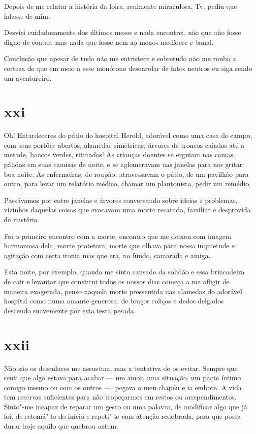 \asterisc

Depois de me relatar a história da loira, realmente miraculosa,
Tv. pediu que falasse de mim.

Desviei cuidadosamente dos últimos meses e nada encontrei, não que não
fosse digno de contar, mas nada que fosse nem ao menos medíocre e banal.

Conclusão que apesar de tudo não me entristece e sobretudo não me
rouba a certeza de que em meio a esse monótono desenrolar de fatos
neutros eu siga sendo um aventureiro.

\section{xxi}

Oh! Entardeceres do pátio do hospital Herold, adorável como uma casa de
campo, com seus portões abertos, alamedas simétricas, árvores de troncos
caiados até a metade, bancos verdes, ritmados! As crianças doentes se
erguiam nas camas, pálidas em suas camisas de noite, e se aglomeravam
nas janelas para nos gritar boa noite. As enfermeiras, de roupão,
atravessavam o pátio, de um pavilhão para outro, para levar um relatório
médico, chamar um plantonista, pedir um remédio.

Passávamos por entre janelas e árvores conversando sobre ideias e
problemas, vizinhos daquelas coisas que evocavam uma morte recatada,
familiar e desprovida de mistério.

Foi o primeiro encontro com a morte, encontro que me deixou com
imagem harmoniosa dela, morte protetora, morte que olhava para nossa
inquietude e agitação com certa ironia mas que era, no fundo, camarada
e amiga.

Esta noite, por exemplo, quando me sinto cansado da solidão e
essa brincadeira de cair e levantar que constitui todos os
nossos dias começa a me afligir de maneira exagerada, penso naquela
morte pressentida nas alamedas do adorável hospital como numa amante
generosa, de braços roliços e dedos delgados descendo suavemente por
esta testa pesada.

\section{xxii}

Não são os desenlaces me assustam, mas a tentativa de os evitar. Sempre que
senti que algo estava para acabar --- um amor, uma situação, um pacto
íntimo comigo mesmo ou com os outros ---, pegava o meu chapéu e ia embora.
A vida tem reservas suficientes para não tropeçarmos em restos ou
arrependimentos. Sinto"-me incapaz de reparar um gesto ou uma palavra, de
modificar algo que já foi, de retomá"-lo do início e repeti"-lo
com atenção redobrada, para que possa durar hoje aquilo que quebrou
ontem.

